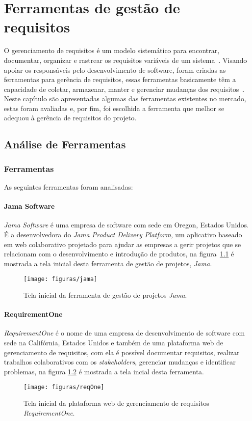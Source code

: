 \chapter[Ferramentas de gestão de requisitos]{Ferramentas de gestão de requisitos}
O gerenciamento de requisitos é um modelo sistemático para encontrar, documentar, organizar e rastrear os requisitos variáveis de um sistema~\cite{sommerville}. Visando apoiar os responsáveis pelo desenvolvimento de software, foram criadas as ferramentas para gerência de requisitos, essas ferramentas basicamente têm a capacidade de coletar, armazenar, manter e gerenciar mudanças dos requisitos~\cite{tcc_rafael_richa}. Neste capítulo são apresentadas algumas das ferramentas existentes no mercado, estas foram avaliadas e, por fim, foi escolhida a ferramenta que melhor se adequou à gerência de requisitos do projeto.

\section{Análise de Ferramentas}
\subsection{Ferramentas}
As seguintes ferramentas foram analisadas:
\subsubsection*{Jama Software}
\textit{Jama Software} é uma empresa de software com sede em Oregon, Estados Unidos. É a desenvolvedora do \textit{Jama Product Delivery Platform}, um aplicativo baseado em web colaborativo projetado para ajudar as empresas a gerir projetos que se relacionam com o desenvolvimento e introdução de produtos, na figura~\ref{jama} é mostrada a tela inicial desta ferramenta de gestão de projetos, \textit{Jama}.
\begin{figure}[!htbp]
	\centering
	\texttt{[image: figuras/jama]}
	\caption{Tela inicial da ferramenta de gestão de projetos \textit{Jama}.}
	\label{jama}
\end{figure}

\subsubsection*{RequirementOne}
\textit{RequirementOne} é o nome de uma empresa de desenvolvimento de software com sede na Califórnia, Estados Unidos e também de uma plataforma web de gerenciamento de requisitos, com ela é possível documentar requisitos, realizar trabalhos colaborativos com os \textit{stakeholders}, gerenciar mudanças e identificar problemas, na figura \ref{reqOne} é mostrada a tela incial desta ferramenta.
\begin{figure}[!htbp]
	\centering
	\texttt{[image: figuras/reqOne]}
	\caption{Tela inicial da plataforma web de gerenciamento de requisitos \textit{RequirementOne}.}
	\label{reqOne}
\end{figure}

